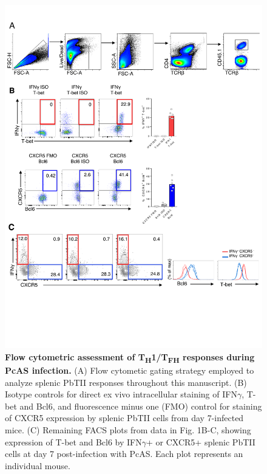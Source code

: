 \begin{figure}
    \centering
    \includegraphics[width=\textwidth]{"Fig S3 rev3"}
    \caption[Flow cytometric assessment of T\textsubscript{H}\textnormal{1}/T\textsubscript{FH} responses during PcAS infection]{\textbf{Flow cytometric assessment of T\textsubscript{H}\textnormal{1}/T\textsubscript{FH} responses during PcAS infection.} (A) Flow cytometic gating strategy employed to analyze splenic PbTII responses throughout this manuscript. (B) Isotype controls for direct ex vivo intracellular staining of IFN\( \gamma \), T-bet and Bcl6, and fluorescence minus one (FMO) control for staining of CXCR5 expression by splenic PbTII cells from day 7-infected mice. (C) Remaining FACS plots from data in Fig. 1B-C, showing expression of T-bet and Bcl6 by IFN\( \gamma \)+ or CXCR5+ splenic PbTII cells at day 7 post-infection with PcAS. Each plot represents an individual mouse.}
    \label{fig:ms3}
\end{figure}

